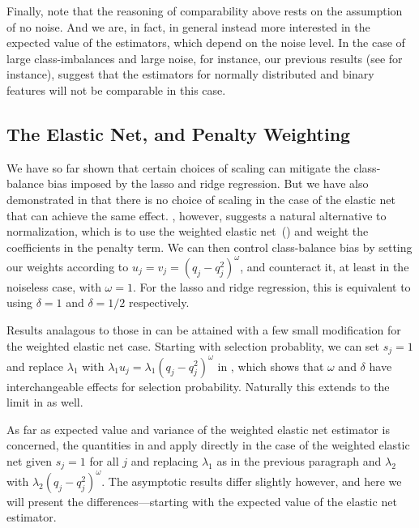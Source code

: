 Finally, note that the reasoning of comparability above rests on the assumption of no
noise. And we are, in fact, in general instead more interested in the expected value of the
estimators, which depend on the noise level. In the case of large class-imbalances and
large noise, for instance, our previous results (see  for
instance), suggest that the estimators for normally distributed and binary features will
not be comparable in this case.


\subsection{The Elastic Net, and Penalty Weighting}\label{sec:binary-weighting}

We have so far shown that certain choices of scaling can mitigate the class-balance bias
imposed by the lasso and ridge regression. But we have also demonstrated in
 that there is no choice of scaling in the case of the
elastic net that can achieve the same effect. , however,
suggests a natural alternative to normalization, which is to use the weighted elastic
net~() and weight the coefficients in the penalty term. We
can then control class-balance bias by setting our weights according to \(u_j = v_j = (q_j
- q_j^2)^{\omega}\), and counteract it, at least in the noiseless case, with \(\omega =
1\). For the lasso and ridge regression, this is equivalent to using \(\delta = 1\) and
\(\delta = 1/2\) respectively.

Results analagous to those in  can be attained with a few
small modification for the weighted elastic net case. Starting with selection probablity,
we can set \(s_j = 1\) and replace \(\lambda_1\) with \(\lambda_1 u_j =
\lambda_1(q_j-q_j^2)^\omega\) in , which shows that
\(\omega\) and \(\delta\) have interchangeable effects for selection probability. Naturally
this extends to the limit in  as well.

As far as expected value and variance of the weighted elastic net estimator is concerned,
the quantities in  and  apply
directly in the case of the weighted elastic net given \(s_j = 1\) for all \(j\) and
replacing \(\lambda_1\) as in the previous paragraph and \(\lambda_2\) with \(\lambda_2
(q_j - q_j^2)^\omega\). The asymptotic results differ slightly however, and here we will
present the differences---starting with the expected value of the elastic net estimator.


